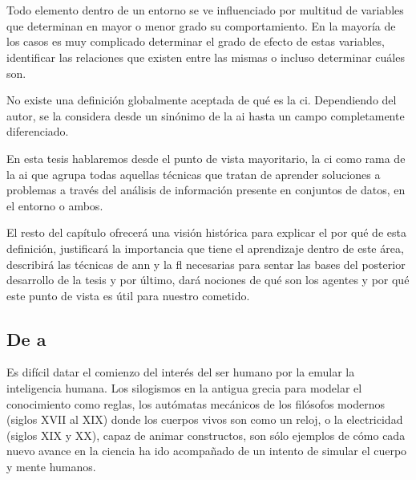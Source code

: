 \chapter{}
\label{ch:sota-ci}

Todo elemento dentro de un entorno se ve influenciado por multitud de variables que determinan en mayor o menor grado su comportamiento. En la mayoría de los casos es muy complicado determinar el grado de efecto de estas variables, identificar las relaciones que existen entre las mismas o incluso determinar cuáles son.

No existe una definición globalmente aceptada de qué es la \acf{ci}. Dependiendo del autor, se la considera desde un sinónimo de la \acf{ai} hasta un campo completamente diferenciado.

En esta tesis hablaremos desde el punto de vista mayoritario, la \ac{ci} como rama de la \ac{ai} que agrupa todas aquellas técnicas que tratan de aprender soluciones a problemas a través del análisis de información presente en conjuntos de datos, en el entorno o ambos.

El resto del capítulo ofrecerá una visión histórica para explicar el por qué de esta definición, justificará la importancia que tiene el aprendizaje dentro de este área, describirá las técnicas de \ac{ann} y la \ac{fl} necesarias para sentar las bases del posterior desarrollo de la tesis y por último, dará nociones de qué son los agentes y por qué este punto de vista es útil para nuestro cometido.

\section{De  a }

Es difícil datar el comienzo del interés del ser humano por la emular la inteligencia humana. Los silogismos en la antigua grecia para modelar el conocimiento como reglas, los autómatas mecánicos de los filósofos modernos (siglos XVII al XIX) donde los cuerpos vivos son como un reloj, o la electricidad (siglos XIX y XX), capaz de animar constructos, son sólo ejemplos de cómo cada nuevo avance en la ciencia ha ido acompañado de un intento de simular el cuerpo y mente humanos.

